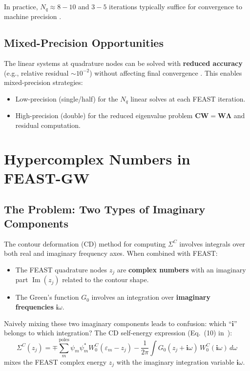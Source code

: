 \documentclass[12pt,a4paper]{article}
\theoremstyle{definition}
\DeclareMathOperator{\ImOp}{Im}
\begin{document}
In practice, $N_q \approx 8{-}10$ and $3{-}5$ iterations typically suffice for convergence to machine precision \cite{Li2025}.

\subsection{Mixed-Precision Opportunities}

The linear systems at quadrature nodes can be solved with \textbf{reduced accuracy} (e.g., relative residual $\sim 10^{-2}$) without affecting final convergence \cite{Brenneck2020}. This enables mixed-precision strategies:
\begin{itemize}
    \item Low-precision (single/half) for the $N_q$ linear solves at each FEAST iteration.
    \item High-precision (double) for the reduced eigenvalue problem $\mathbf{C}\mathbf{W} = \mathbf{W}\mathbf{\Lambda}$ and residual computation.
\end{itemize}

\section{Hypercomplex Numbers in FEAST-GW}

\subsection{The Problem: Two Types of Imaginary Components}

The contour deformation (CD) method for computing $\Sigma^{C}$ involves integrals over both real and imaginary frequency axes. When combined with FEAST:
\begin{itemize}
    \item The FEAST quadrature nodes $z_j$ are \textbf{complex numbers} with an imaginary part $\ImOp(z_j)$ related to the contour shape.
    \item The Green's function $G_0$ involves an integration over \textbf{imaginary frequencies} $\mathbf{i}\omega$.
\end{itemize}

Naively mixing these two imaginary components leads to confusion: which ``$\mathbf{i}$'' belongs to which integration? The CD self-energy expression (Eq.~(10) in~\cite{Li2025}):
\begin{equation}\label{eq:CD_sigma}
\Sigma^{C}(z_j) = \mp\sum_{m}^{\text{poles}} \psi_m\psi_m^{*} W_0^{C}(\varepsilon_m - z_j)
- \frac{1}{2\pi} \int G_0(z_j + \mathbf{i}\omega)\,W_0^{C}(\mathbf{i}\omega)\,d\omega
\end{equation}
mixes the FEAST complex energy $z_j$ with the imaginary integration variable $\mathbf{i}\omega$.
\end{document}
